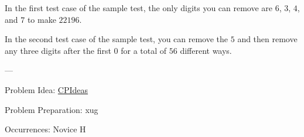 In the first test case of the sample test, the only digits you can remove are $6$, $3$, $4$, and $7$ to make $22196$.

In the second test case of the sample test, you can remove the $5$ and then remove any three digits after the first $0$ for a total of $56$ different ways.

---

Problem Idea: \href{https://fjzzq2002.github.io/cpideas/}{CPIdeas}

Problem Preparation: xug

Occurrences: Novice H
